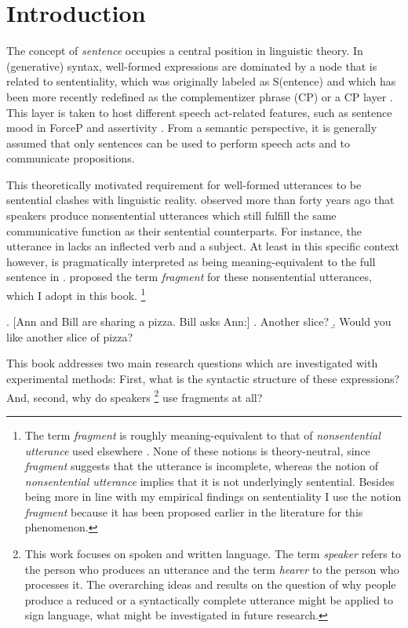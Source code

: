 \chapter{Introduction} \label{sec:intro}
The concept of \textit{sentence} occupies a central position in linguistic theory. In (generative) syntax, well-formed expressions are dominated by a node that is related to sententiality, which was originally labeled as S(entence) \citep[see e.g.][]{chomsky1965} and which has been more recently redefined as the complementizer phrase (CP) or a CP layer \citep{rizzi1997}. This layer is taken to host different speech act-related features, such as sentence mood in  ForceP and assertivity \citep{krifka1995}. From a semantic perspective, it is generally assumed that only sentences can be used to perform speech acts and to communicate propositions.

This theoretically motivated requirement for well-formed utterances to be sentential clashes with linguistic reality. \citet{morgan1973} observed more than forty years ago that speakers produce nonsentential utterances which still fulfill the same communicative function as their sentential counterparts. For instance, the utterance in \Next[a] lacks an inflected verb and a subject. At least in this specific context however, \Next[a] is pragmatically interpreted as being meaning-equivalent to the full sentence in \Next[b]. \citet{morgan1973} proposed the term \textit{fragment} for these nonsentential utterances, which I adopt in this book.%
%
\footnote{The term \textit{fragment} is roughly meaning-equivalent to that of \textit{nonsentential utterance} used elsewhere \citep{fernandez.ginzburg2002, barton.progovac2005, stainton2006}. None of these notions is theory-neutral, since \textit{fragment} suggests that the utterance is incomplete, whereas the notion of \textit{nonsentential utterance} implies that it is not underlyingly sentential. Besides being more in line with my empirical findings on sententiality I use the notion \textit{fragment} because it has been proposed earlier in the literature for this phenomenon.}\afterfn%
%

\ex. [Ann and Bill are sharing a pizza. Bill asks Ann:] 
    \a. Another slice? \label{ex:intro-fragment}
     \b. Would you like another slice of pizza?
 
This book addresses two main research questions which are investigated with experimental methods: First, what is the syntactic structure of these expressions? And, second, why do speakers%
%
\footnote{This work focuses on spoken and written language. The term \textit{speaker} refers to the person who produces an utterance and the term \textit{hearer} to the person who processes it. The overarching ideas and results on the question of why people produce a reduced or a syntactically complete utterance might be applied to sign language, what might be investigated in future research.}\afterfn%
%
use fragments at all?

